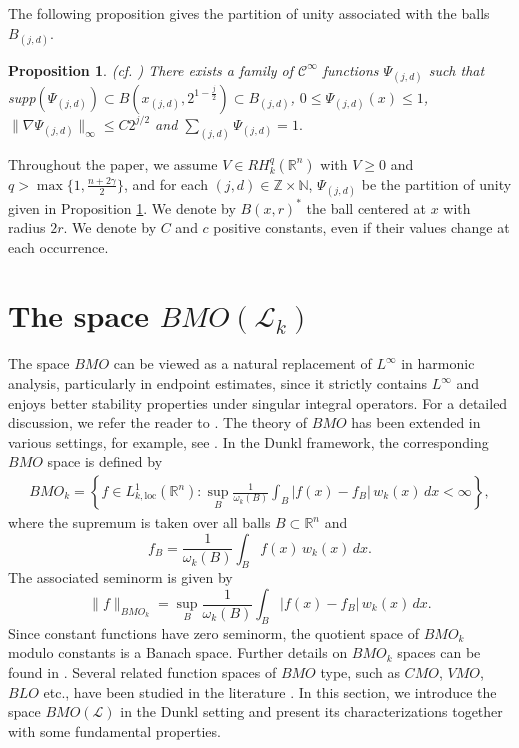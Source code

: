\documentclass[11pt, reqno]{amsproc}
\newtheorem{proposition}[theorem]{Proposition}
\theoremstyle{definition}
\theoremstyle{remark}
\numberwithin{equation}{section}
\begin{document}
The following proposition gives the partition of unity associated with the balls $B_{(j,d)}$. 
\begin{proposition}\label{partition of unity}(cf. \cite{Dziubanski-1999})
    There exists a family of $\mathcal{C}^\infty$ functions $\Psi_{(j,d)}$ such that supp$(\Psi_{(j,d)}) \subset B(x_{(j,d)}, 2^{1-\frac{j}{2}}) \subset B_{(j,d)}$, $0\leq \Psi_{(j,d)}(x) \leq 1$, $\| \nabla \Psi_{(j,d)}\|_{\infty} \leq C 2^{j/2}$ and $\sum\limits_{(j,d)}\Psi_{(j,d)}=1.$ 
\end{proposition}

Throughout the paper, we assume $V\in RH_k^q(\mathbb{R}^n)$ with $V\geq 0$ and $q> \max\{1, \frac{n+2\gamma}{2}\}$,  and for each $(j,d) \in \mathbb{Z}\times \mathbb{N}$, $\Psi_{(j,d)}$ be the partition of unity given in Proposition \ref{partition of unity}. We denote by $B(x,r)^*$ the ball centered at $x$ with radius $2r$.
We denote by $C$ and $c$ positive constants, even if their values change at each occurrence.

\section{The space $BMO(\mathcal{L}_k)$}\label{S:3}
The space $BMO$ can be viewed as a natural replacement of $L^\infty$ in harmonic analysis, particularly in endpoint estimates, since it strictly contains $L^\infty$ and enjoys better stability properties under singular integral operators. For a detailed discussion, we refer the reader to \cite{Stein-book-1}. The theory of $BMO$ has been extended in various settings, for example, see \cite{Dafni-2012, Lin}. In the Dunkl framework, the corresponding $BMO$ space is defined by
\begin{align*}
BMO_k
= \left\{ f \in L_{k,\mathrm{loc}}^{1}(\mathbb{R}^n):
\sup_{B} \frac{1}{\omega_k(B)} \int_{B} \lvert f(x) - f_B \rvert \, w_k(x)\, dx < \infty \right\},
\end{align*}
where the supremum is taken over all balls $B \subset \mathbb{R}^n$ and
\[
f_B = \frac{1}{\omega_k(B)} \int_{B} f(x)\, w_k(x)\, dx .
\]
The associated seminorm is given by
\[
\|f\|_{BMO_k}
= \sup_{B} \frac{1}{\omega_k(B)} \int_{B} \lvert f(x) - f_B \rvert \, w_k(x)\, dx .
\]
Since constant functions have zero seminorm, the quotient space of $BMO_k$ modulo constants is a Banach space. Further details on $BMO_k$ spaces can be found in \cite{Jacek-2023}. Several related function spaces of $BMO$ type, such as $CMO$, $VMO$, $BLO$ etc., have been studied in the literature \cite{Almeida, Jacek-2023, Guo, Jiu}. In this section, we introduce the space $BMO(\mathcal{L})$ in the Dunkl setting and present its characterizations together with some fundamental properties.
\end{document}
